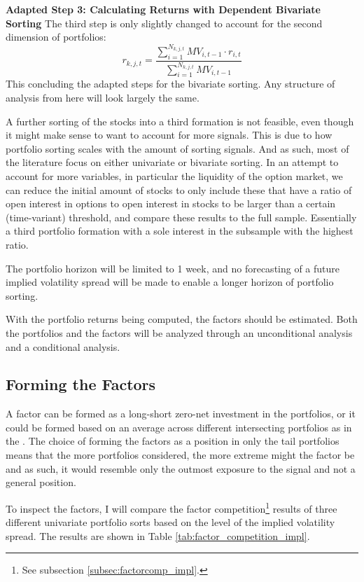 \textbf{Adapted Step 3: Calculating Returns with Dependent Bivariate Sorting} The third step is only slightly changed to account for the second dimension of portfolios:
\begin{equation}
	r_{k,j,t}=\frac{\sum_{i=1}^{N_{k,j,t}}MV_{i,t-1}\cdot r_{i,t}}{\sum_{i=1}^{N_{k,j,t}}MV_{i,t-1}}
\end{equation}
This concluding the adapted steps for the bivariate sorting. Any structure of analysis from here will look largely the same. 

A further sorting of the stocks into a third formation is not feasible, even though it might make sense to want to account for more signals. This is due to how portfolio sorting scales with the amount of sorting signals. And as such, most of the literature focus on either univariate or bivariate sorting. In an attempt to account for more variables, in particular the liquidity of the option market, we can reduce the initial amount of stocks to only include these that have a ratio of open interest in options to open interest in stocks to be larger than a certain (time-variant) threshold, and compare these results to the full sample. Essentially a third portfolio formation with a sole interest in the subsample with the highest ratio.

The portfolio horizon will be limited to 1 week, and no forecasting of a future implied volatility spread will be made to enable a longer horizon of portfolio sorting. 

With the portfolio returns being computed, the factors should be estimated. Both the portfolios and the factors will be analyzed through an unconditional analysis and a conditional analysis.

\subsection{Forming the Factors}\label{subsec:forming_factors}

A factor can be formed as a long-short zero-net investment in the portfolios, or it could be formed based on an average across different intersecting portfolios as in the \cite{fama2015five}. The choice of forming the factors as a position in only the tail portfolios means that the more portfolios considered, the more extreme might the factor be and as such, it would resemble only the outmost exposure to the signal and not a general position. 

To inspect the factors, I will compare the factor competition\footnote{See subsection \ref{subsec:factorcomp_impl}.} results of three different univariate portfolio sorts based on the level of the implied volatility spread. The results are shown in Table \ref{tab:factor_competition_impl}.

